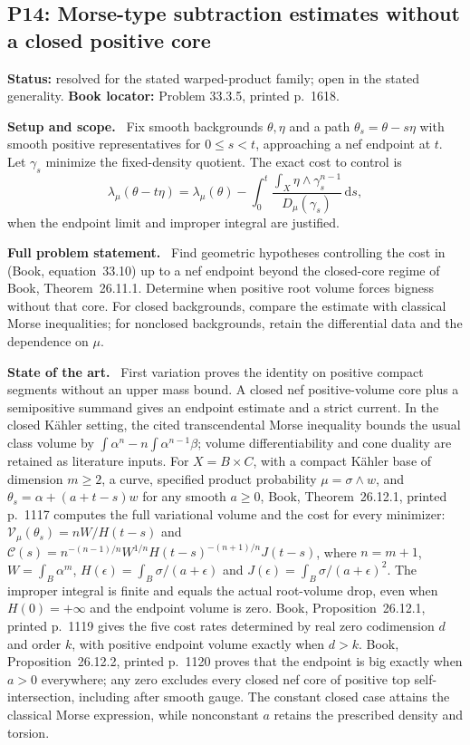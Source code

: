 \documentclass[11pt]{article}
\newcommand{\field}[1]{\par\medskip\noindent\textbf{#1.}\ }
\begin{document}
\subsection{P14: Morse-type subtraction estimates without a closed positive core}
\label{P14}
\noindent\textbf{Status:} resolved for the stated warped-product family; open in the stated generality. \textbf{Book locator:} Problem 33.3.5, printed p.~1618.
\field{Setup and scope} Fix smooth backgrounds $\theta,\eta$ and a path $\theta_s=\theta-s\eta$ with smooth positive representatives for $0\leq s<t$, approaching a nef endpoint at $t$. Let $\gamma_s$ minimize the fixed-density quotient. The exact cost to control is
\[\lambda_\mu(\theta-t\eta)=\lambda_\mu(\theta)
 -\int_0^t\frac{\int_X\eta\wedge\gamma_s^{n-1}}{D_\mu(\gamma_s)}\,\mathrm ds,\]
when the endpoint limit and improper integral are justified.
\field{Full problem statement} Find geometric hypotheses controlling the cost in (Book, equation~33.10) up to a nef endpoint beyond the closed-core regime of Book, Theorem~26.11.1. Determine when positive root volume forces bigness without that core. For closed backgrounds, compare the estimate with classical Morse inequalities; for nonclosed backgrounds, retain the differential data and the dependence on $\mu$.
\field{State of the art} First variation proves the identity on positive compact segments without an upper mass bound. A closed nef positive-volume core plus a semipositive summand gives an endpoint estimate and a strict current. In the closed K\"ahler setting, the cited transcendental Morse inequality bounds the usual class volume by $\int\alpha^n-n\int\alpha^{n-1}\beta$; volume differentiability and cone duality are retained as literature inputs. For $X=B\times C$, with a compact K\"ahler base of dimension $m\geq2$, a curve, specified product probability $\mu=\sigma\wedge w$, and $\theta_s=\alpha+(a+t-s)w$ for any smooth $a\geq0$, Book, Theorem~26.12.1, printed p.~1117 computes the full variational volume and the cost for every minimizer: $\mathcal V_\mu(\theta_s)=nW/H(t-s)$ and $\mathcal C(s)=n^{-(n-1)/n}W^{1/n}H(t-s)^{-(n+1)/n}J(t-s)$, where $n=m+1$, $W=\int_B\alpha^m$, $H(\epsilon)=\int_B\sigma/(a+\epsilon)$ and $J(\epsilon)=\int_B\sigma/(a+\epsilon)^2$. The improper integral is finite and equals the actual root-volume drop, even when $H(0)=+\infty$ and the endpoint volume is zero. Book, Proposition~26.12.1, printed p.~1119 gives the five cost rates determined by real zero codimension $d$ and order $k$, with positive endpoint volume exactly when $d>k$. Book, Proposition~26.12.2, printed p.~1120 proves that the endpoint is big exactly when $a>0$ everywhere; any zero excludes every closed nef core of positive top self-intersection, including after smooth gauge. The constant closed case attains the classical Morse expression, while nonconstant $a$ retains the prescribed density and torsion.
\end{document}
